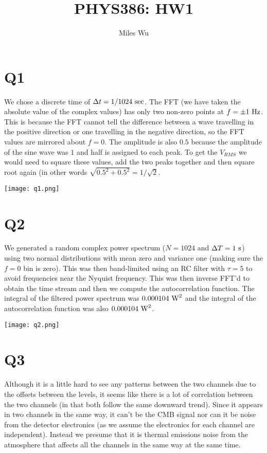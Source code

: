 \documentclass[12pt]{article}
\begin{document}
\title{PHYS386: HW1}
\author{Miles Wu}
\maketitle

\section{Q1}
We chose a discrete time of $\Delta t = 1/1024~\textnormal{sec}$. The FFT (we have taken the absolute value of the complex values) has only two non-zero points at $f = \pm 1~\textnormal{Hz}$. This is because the FFT cannot tell the difference between a wave travelling in the positive direction or one travelling in the negative direction, so the FFT values are mirrored about $f=0$. The amplitude is also $0.5$ because the amplitude of the sine wave was $1$ and half is assigned to each peak. To get the $V_{RMS}$ we would need to square these values, add the two peaks together and then square root again (in other words $\sqrt{0.5^2+0.5^2} = 1/\sqrt{2}$.

\begin{center}
\texttt{[image: q1.png]}
\end{center}

\section{Q2}
We generated a random complex power spectrum ($N=1024$ and $\Delta T = 1~\textnormal{s}$) using two normal distributions with mean zero and variance one (making sure the $f=0$ bin is zero). This was then band-limited using an RC filter with $\tau = 5$ to avoid frequencies near the Nyquist frequency. This was then inverse FFT'd to obtain the time stream and then we compute the autocorrelation function. The integral of the filtered power spectrum was $0.000104~\textnormal{W}^2$ and the integral of the autocorrelation function was also $0.000104~\textnormal{W}^2$.

\begin{center}
\texttt{[image: q2.png]}
\end{center}

\section{Q3}
Although it is a little hard to see any patterns between the two channels due to the offsets between the levels, it seems like there is a lot of correlation between the two channels (in that both follow the same downward trend). Since it appears in two channels in the same way, it can't be the CMB signal nor can it be noise from the detector electronics (as we assume the electronics for each channel are independent). Instead we presume that it is thermal emissions noise from the atmosphere that affects all the channels in the same way at the same time.
\end{document}
